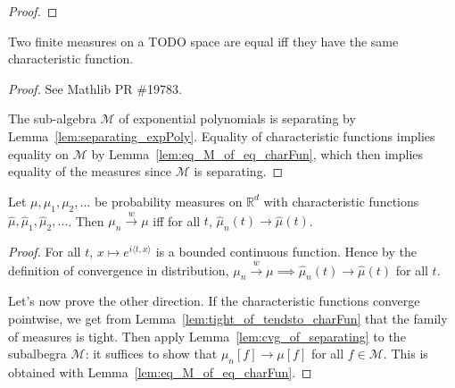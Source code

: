 \begin{proof}
\end{proof}


\begin{lemma}\label{lem:ext_charFun}
Two finite measures on a TODO space are equal iff they have the same characteristic function.
\end{lemma}

\begin{proof}
See Mathlib PR \#19783.

The sub-algebra $\mathcal M$ of exponential polynomials is separating by Lemma~\ref{lem:separating_expPoly}. Equality of characteristic functions implies equality on $\mathcal M$ by Lemma~\ref{lem:eq_M_of_eq_charFun}, which then implies equality of the measures since $\mathcal M$ is separating.
\end{proof}


\begin{theorem}\label{thm:charFun_tendsto_iff_measure_tendsto}
Let $\mu, \mu_1, \mu_2, \ldots$ be probability measures on $\mathbb{R}^d$ with characteristic functions $\hat{\mu}, \hat{\mu}_1, \hat{\mu}_2, \ldots$. Then $\mu_n \xrightarrow{w} \mu$ iff for all $t$, $\hat{\mu}_n(t) \to \hat{\mu}(t)$.
\end{theorem}

\begin{proof}
For all $t$, $x \mapsto e^{i \langle t, x \rangle}$ is a bounded continuous function. Hence by the definition of convergence in distribution, $\mu_n \xrightarrow{w} \mu \implies \hat{\mu}_n(t) \to \hat{\mu}(t)$ for all $t$.

Let's now prove the other direction.
If the characteristic functions converge pointwise, we get from Lemma~\ref{lem:tight_of_tendsto_charFun} that the family of measures is tight. 
Then apply Lemma~\ref{lem:cvg_of_separating} to the subalbegra $\mathcal M$: it suffices to show that $\mu_n[f] \to \mu[f]$ for all $f \in \mathcal M$. This is obtained with Lemma~\ref{lem:eq_M_of_eq_charFun}.
\end{proof}